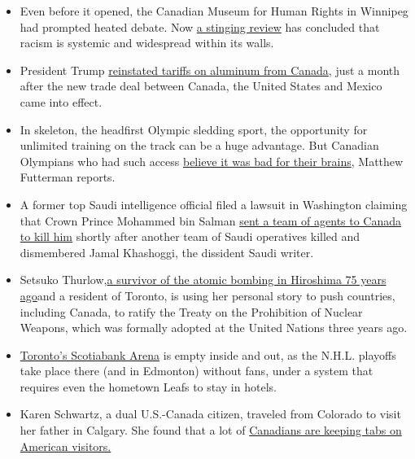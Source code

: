 \begin{itemize}
\item
  Even before it opened, the Canadian Museum for Human Rights in
  Winnipeg had prompted heated debate. Now
  \href{https://www.nytimes3xbfgragh.onion/2020/08/06/world/canada/museum-of-human-rights-discrimination.html}{a
  stinging review} has concluded that racism is systemic and widespread
  within its walls.
\item
  President Trump
  \href{https://www.nytimes3xbfgragh.onion/2020/08/06/business/economy/trump-canadian-aluminum-tariffs.html}{reinstated
  tariffs on aluminum from Canada}, just a month after the new trade
  deal between Canada, the United States and Mexico came into effect.
\item
  In skeleton, the headfirst Olympic sledding sport, the opportunity for
  unlimited training on the track can be a huge advantage. But Canadian
  Olympians who had such access
  \href{https://www.nytimes3xbfgragh.onion/2020/08/01/sports/olympics/concussion-skeleton-sledding-brain-damage.html}{believe
  it was bad for their brains}, Matthew Futterman reports.
\item
  A former top Saudi intelligence official filed a lawsuit in Washington
  claiming that Crown Prince Mohammed bin Salman
  \href{https://www.nytimes3xbfgragh.onion/2020/08/06/world/middleeast/saudi-prince-mohammed-lawsuit-aljabri.html}{sent
  a team of agents to Canada to kill him} shortly after another team of
  Saudi operatives killed and dismembered Jamal Khashoggi, the dissident
  Saudi writer.
\item
  Setsuko
  Thurlow,\href{https://www.nytimes3xbfgragh.onion/2020/08/06/world/asia/hiroshima-japan-setsuko-thurlow.html}{a
  survivor of the atomic bombing in Hiroshima 75 years ago}and a
  resident of Toronto, is using her personal story to push countries,
  including Canada, to ratify the Treaty on the Prohibition of Nuclear
  Weapons, which was formally adopted at the United Nations three years
  ago.
\item
  \href{https://www.nytimes3xbfgragh.onion/2020/08/04/sports/toronto-nhl-playoffs.html}{Toronto's
  Scotiabank Arena} is empty inside and out, as the N.H.L. playoffs take
  place there (and in Edmonton) without fans, under a system that
  requires even the hometown Leafs to stay in hotels.
\item
  Karen Schwartz, a dual U.S.-Canada citizen, traveled from Colorado to
  visit her father in Calgary. She found that a lot of
  \href{https://www.nytimes3xbfgragh.onion/2020/08/07/travel/Canada-border-crossings-coronavirus.html}{Canadians
  are keeping tabs on American visitors.}
\end{itemize}

